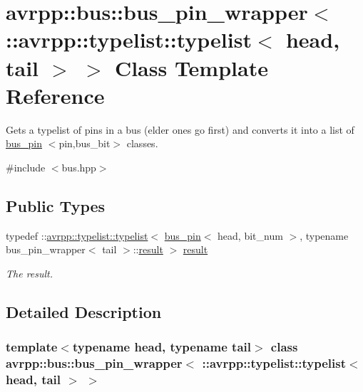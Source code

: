 \hypertarget{classavrpp_1_1bus_1_1bus__pin__wrapper_3_01_1_1avrpp_1_1typelist_1_1typelist_3_01head_00_01tail_01_4_01_4}{
\section{avrpp::bus::bus\_\-pin\_\-wrapper$<$ ::avrpp::typelist::typelist$<$ head, tail $>$ $>$ Class Template Reference}
\label{classavrpp_1_1bus_1_1bus__pin__wrapper_3_01_1_1avrpp_1_1typelist_1_1typelist_3_01head_00_01tail_01_4_01_4}
}


Gets a typelist of pins in a bus (elder ones go first) and converts it into a list of \hyperlink{structavrpp_1_1bus_1_1bus__pin}{bus\_\-pin} $<$pin,bus\_\-bit$>$ classes.  




{\ttfamily \#include $<$bus.hpp$>$}

\subsection*{Public Types}
\begin{DoxyCompactItemize}
\item 
typedef ::\hyperlink{structavrpp_1_1typelist_1_1typelist}{avrpp::typelist::typelist}$<$ \hyperlink{structavrpp_1_1bus_1_1bus__pin}{bus\_\-pin}$<$ head, bit\_\-num $>$, typename bus\_\-pin\_\-wrapper$<$ tail $>$::\hyperlink{structavrpp_1_1typelist_1_1typelist}{result} $>$ \hyperlink{classavrpp_1_1bus_1_1bus__pin__wrapper_3_01_1_1avrpp_1_1typelist_1_1typelist_3_01head_00_01tail_01_4_01_4_a58fd508a2ebc3444706ee577b20e2d38}{result}
\begin{DoxyCompactList}\small\item\em The result. \item\end{DoxyCompactList}\end{DoxyCompactItemize}


\subsection{Detailed Description}
\subsubsection*{template$<$typename head, typename tail$>$ class avrpp::bus::bus\_\-pin\_\-wrapper$<$ ::avrpp::typelist::typelist$<$ head, tail $>$ $>$}


